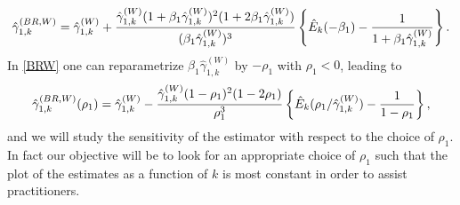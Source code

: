\begin{equation}
\hat{\gamma}_{1,k}^{(BR,W)}=
\hat{\gamma}_{1,k}^{(W)}+ 
{\hat{\gamma}_{1,k}^{(W)} (1+\beta_1\hat{\gamma}_{1,k}^{(W)})^2(1+2\beta_1 \hat{\gamma}_{1,k}^{(W)})\over (\beta_1\hat{\gamma}_{1,k}^{(W)})^3}
\left\{\hat{E}_k (-\beta_1)-{1 \over 1+\beta_1 \hat{\gamma}_{1,k}^{(W)}} \right\}.
\label{BRW}
\end{equation}
In \eqref{BRW} one can reparametrize $\beta_1 \hat{\gamma}_{1,k}^{(W)}$ by $-\rho_1$ with $\rho_1 <0$, leading to
\begin{equation}
\hat{\gamma}_{1,k}^{(BR,W)}(\rho_1)=
\hat{\gamma}_{1,k}^{(W)}- 
{\hat{\gamma}_{1,k}^{(W)} (1-\rho_1)^2(1-2\rho_1)\over \rho_1^3}
\left\{\hat{E}_k (\rho_1/\hat{\gamma}_{1,k}^{(W)})-{1 \over 1-\rho_1} \right\},
\label{BRWrho}
\end{equation}
and we will study the sensitivity of the estimator with respect to the choice of $\rho_1$. In fact our objective will be to look for an appropriate choice of $\rho_1$ such that the plot of the estimates as a function of $k$ is most constant in order to assist practitioners.

